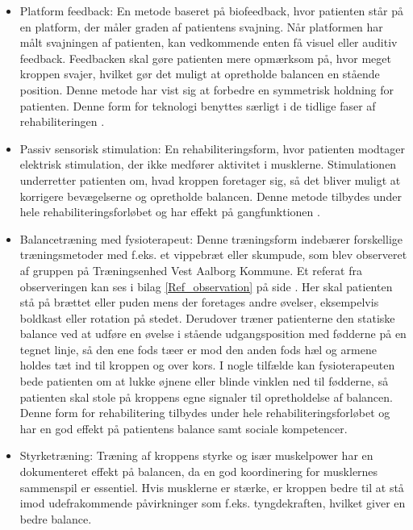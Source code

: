 \begin{itemize} \label{rehabiliteringbalance}
\item Platform feedback: En metode baseret på biofeedback, hvor patienten står på en platform, der måler graden af patientens svajning. Når platformen har målt svajningen af patienten, kan vedkommende enten få visuel eller auditiv feedback. Feedbacken skal gøre patienten mere opmærksom på, hvor meget kroppen svajer, hvilket gør det muligt at opretholde balancen en stående position. Denne metode har vist sig at forbedre en symmetrisk holdning for patienten. \cite{Barclay-Goddard2004} Denne form for teknologi benyttes særligt i de tidlige faser af rehabiliteringen \cite{Sundhedsstyrelsen2011a}.
\item Passiv sensorisk stimulation: En rehabiliteringsform, hvor patienten modtager elektrisk stimulation, der ikke medfører aktivitet i musklerne. Stimulationen underretter patienten om, hvad kroppen foretager sig, så det bliver muligt at korrigere bevægelserne og opretholde balancen. \cite{Sundhedsstyrelsen2010} Denne metode tilbydes under hele rehabiliteringsforløbet og har effekt på gangfunktionen \cite{Sundhedsstyrelsen2011a}.
\item Balancetræning med fysioterapeut: Denne træningsform indebærer forskellige træningsmetoder med f.eks. et vippebræt eller skumpude, som blev observeret af gruppen på Træningsenhed Vest Aalborg Kommune. Et referat fra observeringen kan ses i bilag \ref{Ref_observation} på side \pageref{Ref_observation}. Her skal patienten stå på brættet eller puden mens der foretages andre øvelser, eksempelvis boldkast eller rotation på stedet. Derudover træner patienterne den statiske balance ved at udføre en øvelse i stående udgangsposition med fødderne på en tegnet linje, så den ene fods tæer er mod den anden fods hæl og armene holdes tæt ind til kroppen og over kors. I nogle tilfælde kan fysioterapeuten bede patienten om at lukke øjnene eller blinde vinklen ned til fødderne, så patienten skal stole på kroppens egne signaler til opretholdelse af balancen. \cite{Joergensen2004} Denne form for rehabilitering tilbydes under hele rehabiliteringsforløbet og har en god effekt på patientens balance samt sociale kompetencer. \cite{Sundhedsstyrelsen2011a}
\item Styrketræning: Træning af kroppens styrke og især muskelpower har en dokumenteret effekt på balancen, da en god koordinering for musklernes sammenspil er essentiel. Hvis musklerne er stærke, er kroppen bedre til at stå imod udefrakommende påvirkninger som f.eks. tyngdekraften, hvilket giver en bedre balance. \cite{Joergensen2004}
\end{itemize}


